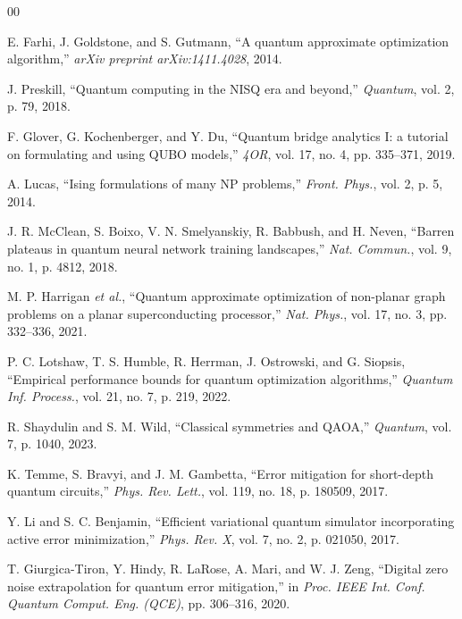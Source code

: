 \documentclass[conference]{IEEEtran}
\begin{document}

\begin{thebibliography}{00}

E. Farhi, J. Goldstone, and S. Gutmann,
``A quantum approximate optimization algorithm,''
\textit{arXiv preprint arXiv:1411.4028}, 2014.

J. Preskill,
``Quantum computing in the NISQ era and beyond,''
\textit{Quantum}, vol. 2, p. 79, 2018.

F. Glover, G. Kochenberger, and Y. Du,
``Quantum bridge analytics I: a tutorial on formulating and using QUBO
models,''
\textit{4OR}, vol. 17, no. 4, pp. 335--371, 2019.

A. Lucas,
``Ising formulations of many NP problems,''
\textit{Front. Phys.}, vol. 2, p. 5, 2014.

J. R. McClean, S. Boixo, V. N. Smelyanskiy, R. Babbush, and H. Neven,
``Barren plateaus in quantum neural network training landscapes,''
\textit{Nat. Commun.}, vol. 9, no. 1, p. 4812, 2018.

M. P. Harrigan \textit{et al.},
``Quantum approximate optimization of non-planar graph problems on a
planar superconducting processor,''
\textit{Nat. Phys.}, vol. 17, no. 3, pp. 332--336, 2021.

P. C. Lotshaw, T. S. Humble, R. Herrman, J. Ostrowski, and G. Siopsis,
``Empirical performance bounds for quantum optimization algorithms,''
\textit{Quantum Inf. Process.}, vol. 21, no. 7, p. 219, 2022.

R. Shaydulin and S. M. Wild,
``Classical symmetries and QAOA,''
\textit{Quantum}, vol. 7, p. 1040, 2023.

K. Temme, S. Bravyi, and J. M. Gambetta,
``Error mitigation for short-depth quantum circuits,''
\textit{Phys. Rev. Lett.}, vol. 119, no. 18, p. 180509, 2017.

Y. Li and S. C. Benjamin,
``Efficient variational quantum simulator incorporating active error
minimization,''
\textit{Phys. Rev. X}, vol. 7, no. 2, p. 021050, 2017.

T. Giurgica-Tiron, Y. Hindy, R. LaRose, A. Mari, and W. J. Zeng,
``Digital zero noise extrapolation for quantum error mitigation,''
in \textit{Proc. IEEE Int. Conf. Quantum Comput. Eng. (QCE)},
pp. 306--316, 2020.


\end{thebibliography}
\end{document}
